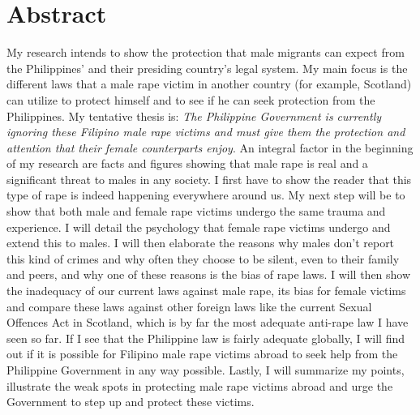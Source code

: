 \section{Abstract}


My research intends to show the protection that male migrants can expect from the Philippines' and their presiding country's legal system. My main focus is the different laws that a male rape victim in another country (for example, Scotland) can utilize to protect himself and to see if he can seek protection from the Philippines. My tentative thesis is:\textit{ The Philippine Government is currently ignoring these Filipino male rape victims and must give them the protection and attention that their female counterparts enjoy}. An integral factor in the beginning of my research are facts and figures showing that male rape is real and a significant threat to males in any society. I first have to show the reader that this type of rape is indeed happening everywhere around us. My next step will be to show that both male and female rape victims undergo the same trauma and experience. I will detail the psychology that female rape victims   undergo and extend this to males. I will then elaborate the reasons why males don't report this kind of crimes and why often they choose to be silent, even to their family and peers, and why one of these reasons is the bias of rape laws. I will then show the inadequacy of our current laws against male rape, its bias for female victims and compare these laws against other foreign laws like the current Sexual Offences Act in Scotland, which is by far the most adequate anti-rape law I have seen so far. If I see that the Philippine law is fairly adequate globally, I will find out if it is possible for Filipino male rape victims abroad to seek help from the Philippine Government in any way possible. Lastly, I will summarize my points, illustrate the weak spots in protecting male rape victims abroad and urge the Government to step up and protect these victims.

